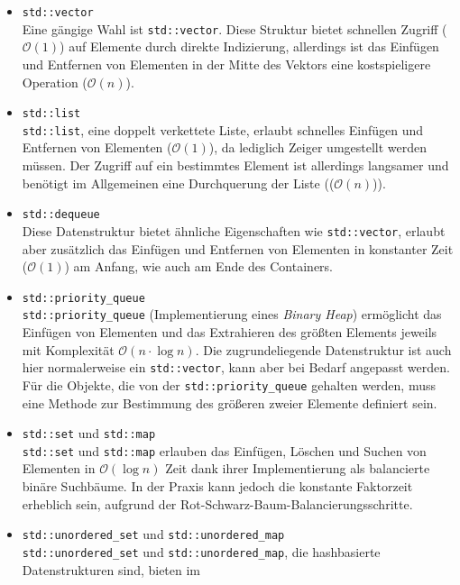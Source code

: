 \begin{itemize}
\begin{itemize}
        \item \texttt{std::vector}\\
        Eine gängige Wahl ist \texttt{std::vector}.
        Diese Struktur bietet schnellen Zugriff ($\mathcal{O}(1)$) auf Elemente durch direkte Indizierung, allerdings ist
        das Einfügen und Entfernen von Elementen in der Mitte des Vektors eine kostspieligere Operation ($\mathcal{O}(n)$).
        \item \texttt{std::list}\\
        \texttt{std::list}, eine doppelt verkettete Liste, erlaubt schnelles Einfügen und Entfernen von Elementen ($\mathcal{O}(1)$),
        da lediglich Zeiger umgestellt werden müssen.
        Der Zugriff auf ein bestimmtes Element ist allerdings langsamer und benötigt im Allgemeinen eine Durchquerung der Liste (($\mathcal{O}(n)$)).
        \item \texttt{std::dequeue}\\
        Diese Datenstruktur bietet ähnliche Eigenschaften wie \texttt{std::vector}, erlaubt aber zusätzlich das Einfügen
        und Entfernen von Elementen in konstanter Zeit ($\mathcal{O}(1)$) am Anfang, wie auch am Ende des Containers.
        \item \texttt{std::priority\_queue}\\
        \texttt{std::priority\_queue} (Implementierung eines \textit{Binary Heap}) ermöglicht das Einfügen von Elementen und das Extrahieren des größten Elements jeweils
        mit Komplexität $\mathcal{O}(n\cdot\log n)$.
        Die zugrundeliegende Datenstruktur ist auch hier normalerweise ein \texttt{std::vector}, kann aber bei Bedarf angepasst werden.
        Für die Objekte, die von der \texttt{std::priority\_queue} gehalten werden, muss eine Methode zur Bestimmung des
        größeren zweier Elemente definiert sein.
        \item \texttt{std::set} und \texttt{std::map}\\
        \texttt{std::set} und \texttt{std::map} erlauben das Einfügen, Löschen und Suchen von Elementen in $\mathcal{O}(\log n)$ Zeit
        dank ihrer Implementierung als balancierte binäre Suchbäume.
        In der Praxis kann jedoch die konstante Faktorzeit erheblich sein, aufgrund der Rot-Schwarz-Baum-Balancierungsschritte.
        \item \texttt{std::unordered\_set} und \texttt{std::unordered\_map}\\
        \texttt{std::unordered\_set} und \texttt{std::unordered\_map}, die hashbasierte Datenstrukturen sind, bieten im

\end{itemize}
\end{itemize}
